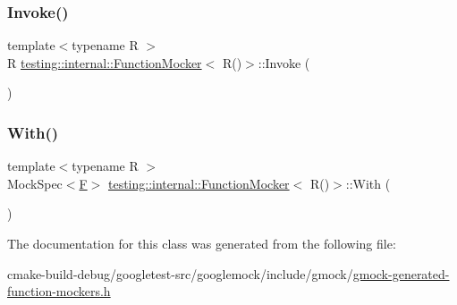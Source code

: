 \subsubsection{\texorpdfstring{Invoke()}{Invoke()}}
{\footnotesize\ttfamily template$<$typename R $>$ \\
R \mbox{\hyperlink{classtesting_1_1internal_1_1FunctionMocker}{testing\+::internal\+::\+Function\+Mocker}}$<$ R()$>$\+::Invoke (\begin{DoxyParamCaption}{ }\end{DoxyParamCaption})\hspace{0.3cm}{\ttfamily [inline]}}

\mbox{\label{classtesting_1_1internal_1_1FunctionMocker_3_01R_07_08_4_a4bd0ee604f6917fcfe8aae52a1f47cf3}} 
\subsubsection{\texorpdfstring{With()}{With()}}
{\footnotesize\ttfamily template$<$typename R $>$ \\
Mock\+Spec$<$\mbox{\hyperlink{classtesting_1_1internal_1_1FunctionMocker_3_01R_07_08_4_a2c1d7da413176d87405227df90a95521}{F}}$>$ \mbox{\hyperlink{classtesting_1_1internal_1_1FunctionMocker}{testing\+::internal\+::\+Function\+Mocker}}$<$ R()$>$\+::With (\begin{DoxyParamCaption}{ }\end{DoxyParamCaption})\hspace{0.3cm}{\ttfamily [inline]}}



The documentation for this class was generated from the following file\+:\begin{DoxyCompactItemize}
\item 
cmake-\/build-\/debug/googletest-\/src/googlemock/include/gmock/\mbox{\hyperlink{gmock-generated-function-mockers_8h}{gmock-\/generated-\/function-\/mockers.\+h}}\end{DoxyCompactItemize}
